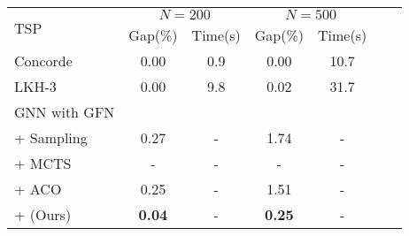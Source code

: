 \begin{tabular}{lcccccc}
    \toprule
    \multirow{2}{*}{TSP} & \multicolumn{2}{c}{$N=200$} & \multicolumn{2}{c}{$N=500$}  \\
     \cmidrule(r){2-3} \cmidrule(r){4-5} 
     & Gap(\%) & Time(s) & Gap(\%) & Time(s) \\
    \midrule
    Concorde & 0.00 & 0.9  & 0.00 & 10.7  \\
    LKH-3    & 0.00 & 9.8  & 0.02 & 31.7  \\
    
    \midrule
    GNN with GFN &  \\
    \phantom{0} + Sampling & 0.27 & - & 1.74 & - \\
    \phantom{0} + MCTS & - & - & - & - \\
    \phantom{0} + ACO  & 0.25 & - & 1.51 & - \\
    \phantom{0} + \ours{} (Ours) & \textbf{0.04} & - & \textbf{0.25} & - \\ 

    \bottomrule
\end{tabular}

